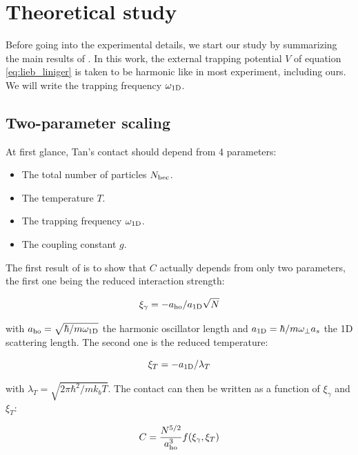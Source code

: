 \section{Theoretical study}

\label{sec:1D_theory}

Before going into the experimental details, we start our study by summarizing the main results of \cite{yao2018tan}. In this work, the external trapping potential $V$ of equation \ref{eq:lieb_liniger} is taken to be harmonic like in most experiment, including ours. We will write the trapping frequency $\omega_{\rm{1D}}$. 

\subsection{Two-parameter scaling}

At first glance, Tan's contact should depend from 4 parameters:

\begin{itemize}
    \item The total number of particles $N_{\rm{bec}}$.
    \item The temperature $T$.
    \item The trapping frequency $\omega_{\rm{1D}}$.
    \item The coupling constant $g$.
\end{itemize}

\noindent The first result of \cite{yao2018tan} is to show that $C$ actually depends from only two parameters, the first one being the reduced interaction strength:

\begin{equation}
    \xi_{\gamma}=-a_{\rm{ho}}/a_{\rm{1D}}\sqrt{N}
    \label{eq:xi_gamma}
\end{equation}

\noindent with $a_{\rm{ho}}=\sqrt{\hbar/m \omega_{\rm{1D}}}$ the harmonic oscillator length and $a_{\rm{1D}}=\hbar/m \omega_{\perp} a_s$ the 1D scattering length. The second one is the reduced temperature:

\begin{equation}
    \xi_T=-a_{\rm{1D}}/\lambda_T
\end{equation}

\noindent with $\lambda_T=\sqrt{2\pi \hbar^2/m k_b T}$. The contact can then be written as a function of $\xi_{\gamma}$ and $\xi_{T}$:

\begin{equation}
    C= \frac{N^{5/2}}{a_{\rm{ho}}^3} f(\xi_{\gamma},\xi_{T})
\end{equation}

